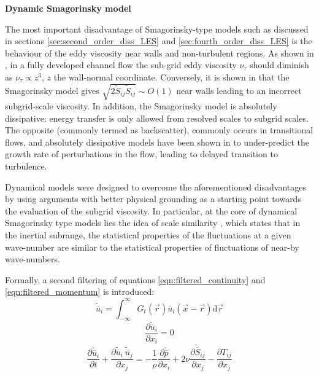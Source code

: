 \par{\textbf{Dynamic Smagorinsky model}\\}
\label{sec:dynamic_smag_LES}

The most important disadvantage of Smagorinsky-type models such as discussed in sections 
\ref{sec:second_order_diss_LES} and \ref{sec:fourth_order_diss_LES} is the behaviour of the
eddy viscosity near walls and non-turbulent regions. As shown in \citet{pope2000}, in a fully developed
channel flow the sub-grid eddy viscosity $\nu_\tau$ should diminish as $\nu_\tau \propto z^3$, $z$ the
wall-normal coordinate. Conversely, it is shown in \citet{nicoud1999} that the Smagorinsky model gives
$\sqrt{2 \tilde{S}_{ij} \tilde{S}_{ij}} \sim O(1)$ near walls leading to an incorrect subgrid-scale
viscosity. In addition, the Smagorinsky model is absolutely dissipative: energy transfer is only allowed
from resolved scales to subgrid scales. The opposite (commonly termed as backscatter), commonly occurs in
transitional flows, and absolutely dissipative models have been shown in \citet{piomelli1990} to
under-predict the growth rate of perturbations in the flow, leading to delayed transition to turbulence.%
\par
Dynamical models were designed to overcome the aforementioned disadvantages by using arguments
with better physical grounding as a starting point towards the evaluation of the subgrid viscosity.
In particular, at the core of dynamical Smagorinsky type models lies the idea of scale similarity
\citep{bardina1980}, which states that in the inertial subrange, the statistical properties of the
fluctuations at a given wave-number are similar to the statistical properties of fluctuations of
near-by wave-numbers.
\par
Formally, a second filtering of equations \eqref{eqn:filtered_continuity} and
\eqref{eqn:filtered_momentum} is introduced:
\begin{equation}
\tilde{\overline{u}}_i = \int_{-\infty}^\infty G_t\left( \overrightarrow{r} \right) \overline{u}_i \left( \overrightarrow{x} - \overrightarrow{r} \right) \text{d} \overrightarrow{r}
\label{eqn:les_test_filtering}
\end{equation}
\begin{equation}
\frac{\partial \tilde{\overline{u}}_i}{\partial x_i} = 0
\label{eqn:twice_filtered_continuity}
\end{equation}
\begin{equation}
\frac{\partial \tilde{\overline{u}}_i}{\partial t} + \frac{\partial \tilde{\overline{u}}_i \ \tilde{\overline{u}}_j}{\partial x_j} =
 -\frac 1 \rho \frac{\partial \tilde{\overline{p}}}{\partial x_i}
 + 2 \nu \frac{\partial \tilde{\overline{S}}_{ij}}{\partial x_j} - \frac{\partial T_{ij}}{\partial x_j}
\label{eqn:twice_filtered_momentum}
\end{equation}

